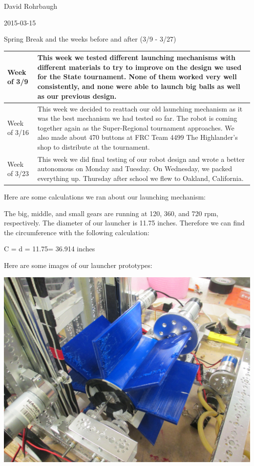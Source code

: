 David Rohrbaugh

2015-03-15

Spring Break and the weeks before and after (3/9 - 3/27)

\begin{tabular}{|p{5cm}|p{5cm}|}
 \hline
 Week of 3/9&
 This week we tested different launching mechanisms with different materials to try to improve on the design we used for the State tournament. None of them worked very well consistently, and none were able to launch big balls as well as our previous design.\\
\hline
 Week of 3/16&
 This week we decided to reattach our old launching mechanism as it was the best mechanism we had tested so far. The robot is coming together again as the Super-Regional tournament approaches. We also made about 470 buttons at FRC Team 4499 The Highlander's shop to distribute at the tournament.\\
\hline
 Week of 3/23&
 This week we did final testing of our robot design and wrote a better autonomous on Monday and Tuesday. On Wednesday, we packed everything up. Thursday after school we flew to Oakland, California.\\
 \hline
\end{tabular}

\medskip

Here are some calculations we ran about our launching mechanism:

The big, middle, and small gears are running at 120, 360, and 720 rpm, respectively. The diameter of our launcher is 11.75 inches. Therefore we can find the circumference with the following calculation:

C = \pi d = 11.75\pi = 36.914 inches

\pagebreak

Here are some images of our launcher prototypes:

\begin{center}
 \includegraphics[width=\textwidth]{./Entries/Images/launchProto7.JPG}
\end{center}

